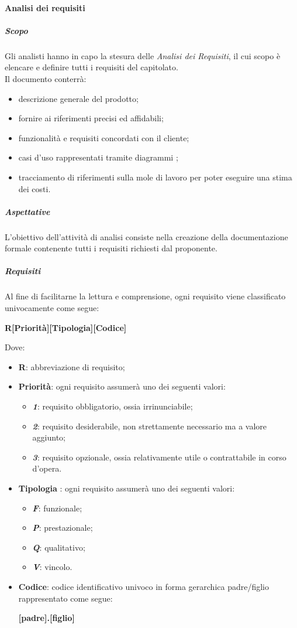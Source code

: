 			\paragraph{Analisi dei requisiti}
				\subparagraph{Scopo}
				Gli analisti hanno in capo la stesura delle \textit{Analisi dei Requisiti}, il cui scopo è elencare e definire tutti i requisiti del capitolato.
				\\ 
				Il documento conterrà:
				\begin{itemize}
					\item descrizione generale del prodotto;
					\item fornire ai  riferimenti precisi ed affidabili;
					\item funzionalità e requisiti concordati con il cliente;
					\item casi d'uso rappresentati tramite diagrammi ;	
					\item tracciamento di riferimenti sulla mole di lavoro per poter eseguire una stima dei costi.			
				\end{itemize}
				\subparagraph{Aspettative}
				L'obiettivo dell'attività di analisi consiste nella creazione della documentazione formale contenente tutti i requisiti richiesti dal proponente.
				\subparagraph{Requisiti}
				Al fine di facilitarne la lettura e comprensione, ogni requisito viene classificato univocamente come segue:				
				\begin{center}
					\textbf{R[Priorità][Tipologia][Codice]}
				\end{center}
				Dove:
				\begin{itemize}
					\item \textbf{R}: abbreviazione di requisito;
					\item \textbf{Priorità}: ogni requisito assumerà uno dei seguenti valori:
					\begin{itemize}
						\item \textbf{\textit{1}}: requisito obbligatorio, ossia irrinunciabile;
						\item \textbf{\textit{2}}: requisito desiderabile, non strettamente necessario ma a valore aggiunto;
						\item \textbf{\textit{3}}: requisito opzionale, ossia relativamente utile o contrattabile in corso d'opera.
					\end{itemize}
					\item \textbf{Tipologia} : ogni requisito assumerà uno dei seguenti valori:
					\begin{itemize}
						\item \textbf{\textit{F}}: funzionale;
						\item \textbf{\textit{P}}: prestazionale;
						\item \textbf{\textit{Q}}: qualitativo;
						\item \textbf{\textit{V}}: vincolo.
					\end{itemize}
					\item \textbf{Codice}: codice identificativo univoco in forma gerarchica padre/figlio rappresentato come segue:
					\begin{center}
						\textbf{[padre].[figlio]}
					\end{center}
				\end{itemize}				
